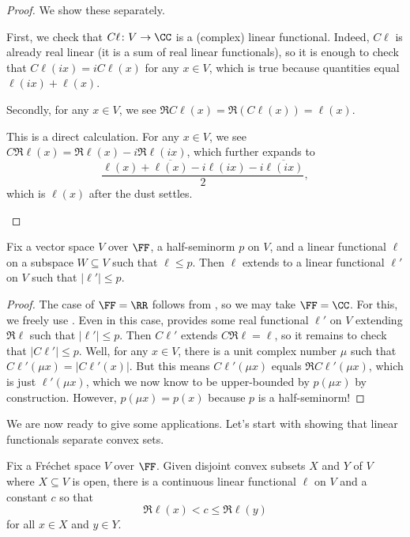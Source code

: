 \documentclass[notes.tex]{subfiles}
\begin{document}
\begin{proof}
	We show these separately.
	\begin{listalph}
		\item First, we check that $C\ell\colon V\to\CC$ is a (complex) linear functional. Indeed, $C\ell$ is already real linear (it is a sum of real linear functionals), so it is enough to check that $C\ell(ix)=iC\ell(x)$ for any $x\in V$, which is true because quantities equal $\ell(ix)+\ell(x)$.

		Secondly, for any $x\in V$, we see $\Re C\ell(x)=\Re(C\ell(x))=\ell(x)$.
		
		\item This is a direct calculation. For any $x\in V$, we see $C\Re\ell(x)=\Re\ell(x)-i\Re\ell(ix)$, which further expands to
		\[\frac{\ell(x)+\overline{\ell(x)}-i\ell(ix)-i\overline{\ell(ix)}}2,\]
		which is $\ell(x)$ after the dust settles.
		\qedhere
	\end{listalph}
\end{proof}
\begin{theorem} \label{thm:hahn-banach-exist}
	Fix a vector space $V$ over $\FF$, a half-seminorm $p$ on $V$, and a linear functional $\ell$ on a subspace $W\subseteq V$ such that $\ell\le p$. Then $\ell$ extends to a linear functional $\ell'$ on $V$ such that $\left|\ell'\right|\le p$.
\end{theorem}
\begin{proof}
	The case of $\FF=\RR$ follows from , so we may take $\FF=\CC$. For this, we freely use . Even in this case,  provides some real functional $\ell'$ on $V$ extending $\Re\ell$ such that $\left|\ell'\right|\le p$. Then $C\ell'$ extends $C\Re\ell=\ell$, so it remains to check that $\left|C\ell'\right|\le p$. Well, for any $x\in V$, there is a unit complex number $\mu$ such that $C\ell'(\mu x)=\left|C\ell'(x)\right|$. But this means $C\ell'(\mu x)$ equals $\Re C\ell'(\mu x)$, which is just $\ell'(\mu x)$, which we now know to be upper-bounded by $p(\mu x)$ by construction. However, $p(\mu x)=p(x)$ because $p$ is a half-seminorm!
\end{proof}
We are now ready to give some applications. Let's start with showing that linear functionals separate convex sets.
\begin{theorem} \label{thm:hahn-banach-separate}
	Fix a Fr\'echet space $V$ over $\FF$. Given disjoint convex subsets $X$ and $Y$ of $V$ where $X\subseteq V$ is open, there is a continuous linear functional $\ell$ on $V$ and a constant $c$ so that
	\[\Re\ell(x)<c\le\Re\ell(y)\]
	for all $x\in X$ and $y\in Y$.
\end{theorem}
\end{document}
